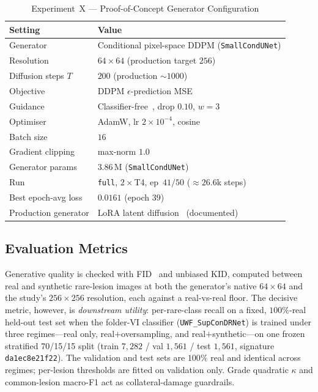 \documentclass[journal,twoside,web]{ieeecolor}
\begin{document}
\begin{table}[!t]
\caption{Experiment~X --- Proof-of-Concept Generator Configuration}
\label{tab:exp10_hyper}
\centering
\setlength{\tabcolsep}{5pt}
\begin{tabular}{|l|l|}
\hline
\textbf{Setting} & \textbf{Value} \\
\hline
Generator & Conditional pixel-space DDPM (\texttt{SmallCondUNet}) \\
Resolution & $64\times64$ (production target $256$) \\
Diffusion steps $T$ & $200$ (production $\sim1000$) \\
Objective & DDPM $\epsilon$-prediction MSE~\cite{ddpm} \\
Guidance & Classifier-free~\cite{cfg}, drop $0.10$, $w{=}3$ \\
Optimiser & AdamW, lr $2\times10^{-4}$, cosine \\
Batch size & $16$ \\
Gradient clipping & max-norm $1.0$ \\
Generator params & $3.86$\,M (\texttt{SmallCondUNet}) \\
Run & \texttt{full}, $2\times$T4, ep~$41/50$ ($\approx26.6$k steps) \\
Best epoch-avg loss & $0.0161$ (epoch $39$) \\
Production generator & LoRA latent diffusion~\cite{ldm} (documented) \\
\hline
\end{tabular}
\end{table}

\subsection{Evaluation Metrics}
Generative quality is checked with FID~\cite{fid} and unbiased KID, computed between
real and synthetic rare-lesion images at both the generator's native $64\times64$ and
the study's $256\times256$ resolution, each against a real-vs-real floor. The
decisive metric, however, is \emph{downstream utility}: per-rare-class recall on a
fixed, $100\%$-real held-out test set when the folder-VI classifier
(\texttt{UWF\_SupConDRNet}) is trained under three regimes---real only,
real$+$oversampling, and real$+$synthetic---on one frozen stratified 70/15/15 split
(train $7{,}282$ / val $1{,}561$ / test $1{,}561$, signature \texttt{da1ec8e21f22}).
The validation and test sets are $100\%$ real and identical across regimes; per-lesion
thresholds are fitted on validation only. Grade quadratic $\kappa$ and common-lesion
macro-F1 act as collateral-damage guardrails.
\end{document}
